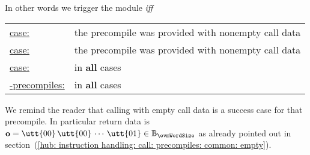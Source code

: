 \saNote{} In other words we trigger the \mmuMod{} module \emph{iff}
\begin{center}
	\renewcommand{\arraystretch}{1.5}
	\begin{tabular}{|ll|}
		\hline
		\underline{\instEcadd{}     case:} & the precompile was provided with nonempty call data \\
		\underline{\instEcmul{}     case:} & the precompile was provided with nonempty call data \\
		\underline{\instEcpairing{} case:} & in \textbf{all} cases                               \\
		\underline{\blsMod{}-precompiles:} & in \textbf{all} cases                               \\ \hline
	\end{tabular}
\end{center}
We remind the reader that calling \instEcpairing{} with empty call data is a success case for that precompile.
In particular return data is
$\textbf{o} = \utt{00}\, \utt{00}\, \cdots \, \utt{01} \in \mathbb{B}_{\evmWordSize}$
as already pointed out in
section~(\ref{hub: instruction handling: call: precompiles: common: empty}).
